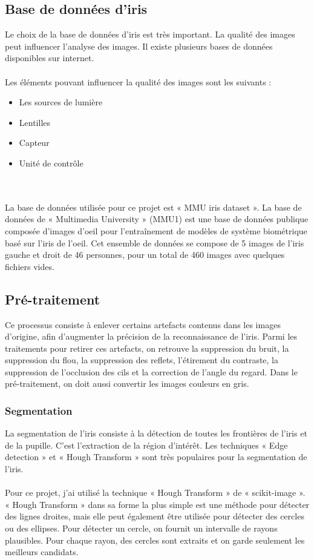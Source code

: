 \documentclass[12pt,twoside,letterpaper]{article}
\begin{document}
\subsection{Base de données d’iris}
Le choix de la base de données d’iris est très important. La qualité des images peut influencer l’analyse des images. Il existe plusieurs bases de données disponibles sur internet.
\\~\\
Les éléments pouvant influencer la qualité des images sont les suivants :
\begin{itemize}
    \item Les sources de lumière
    \item Lentilles
    \item Capteur
    \item Unité de contrôle
\end{itemize}
\cite{ref_01}\cite{ref_06}
\ \\~\\
La base de données utilisée pour ce projet est « MMU iris dataset ». La base de données de « Multimedia University » (MMU1) est une base de données publique composée d'images d'oeil pour l'entraînement de modèles de système biométrique basé sur l'iris de l'oeil. Cet ensemble de données se compose de 5 images de l'iris gauche et droit de 46 personnes, pour un total de 460 images avec quelques fichiers vides.\cite{ref_05}

\subsection{Pré-traitement}
Ce processus consiste à enlever certains artefacts contenus dans les images d’origine, afin d’augmenter la précision de la reconnaissance de l’iris. Parmi les traitements pour retirer ces artefacts, on retrouve la suppression du bruit, la suppression du flou, la suppression des reflets, l’étirement du contraste, la suppression de l’occlusion des cils et la correction de l'angle du regard. Dans le pré-traitement, on doit aussi convertir les images couleurs en gris.\cite{ref_01}\cite{ref_06}


\subsubsection{Segmentation}
La segmentation de l’iris consiste à la détection de toutes les frontières de l’iris et de la pupille. C’est l’extraction de la région d’intérêt. Les techniques « Edge detection » et « Hough Transform » sont très populaires pour la segmentation de l’iris. 
\\~\\
Pour ce projet, j'ai utilisé la technique « Hough Transform » de « scikit-image ». « Hough Transform » dans sa forme la plus simple est une méthode pour détecter des lignes droites, mais elle peut également être utilisée pour détecter des cercles ou des ellipses. Pour détecter un cercle, on fournit un intervalle de rayons plausibles. Pour chaque rayon, des cercles sont extraits et on garde seulement les meilleurs candidats.\cite{ref_04}
\end{document}

